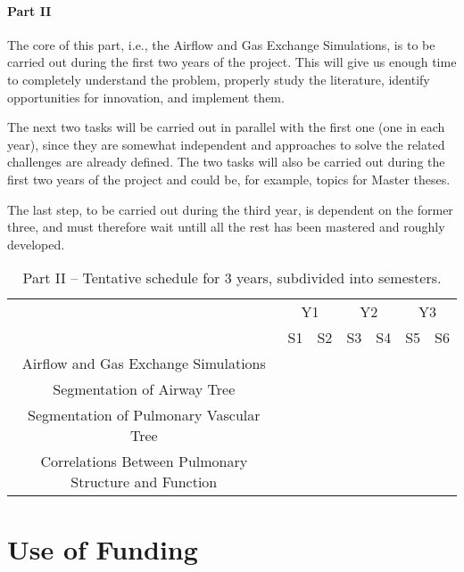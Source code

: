 \paragraph{Part II}

The core of this part, i.e., the Airflow and Gas Exchange Simulations, is to be carried out during the first two years of the project. This will give us enough time to completely understand the problem, properly study the literature, identify opportunities for innovation, and implement them. 

The next two tasks will be carried out in parallel with the first one (one in each year), since they are somewhat independent and approaches to solve the related challenges are already defined. The two tasks will also be carried out during the first two years of the project and could be, for example, topics for Master theses. 

The last step, to be carried out during the third year, is dependent on the former three, and must therefore wait untill all the rest has been mastered and roughly developed. 

\begin{table}[h]\centering
\begin{tabular}{c|c|c|c|c|c|c|}
\cline{2-7}
 & \multicolumn{2}{|c|}{Y1} & \multicolumn{2}{|c|}{Y2} & \multicolumn{2}{|c|}{Y3} \\ \cline{2-7}
 & S1 & S2 & S3 & S4 & S5 & S6 \\ \hline
\multicolumn{1}{|c|}{Airflow and Gas Exchange Simulations} & \cellcolor{green} & \cellcolor{green} & \cellcolor{green} & \cellcolor{green} & & \\ \hline
\multicolumn{1}{|c|}{Segmentation of Airway Tree} & \cellcolor{green} & \cellcolor{green} & & & & \\ \hline
\multicolumn{1}{|c|}{Segmentation of Pulmonary Vascular Tree} & \cellcolor{green} & \cellcolor{green} & \cellcolor{green} & \cellcolor{green} & & \\ \hline
\multicolumn{1}{|c|}{Correlations Between Pulmonary Structure and Function} & & & & & \cellcolor{green} & \cellcolor{green} \\ \hline
\end{tabular}
\caption{Part II -- Tentative schedule for 3 years, subdivided into semesters.}
\label{tab:schedule2}
\end{table}


\section{Use of Funding}

